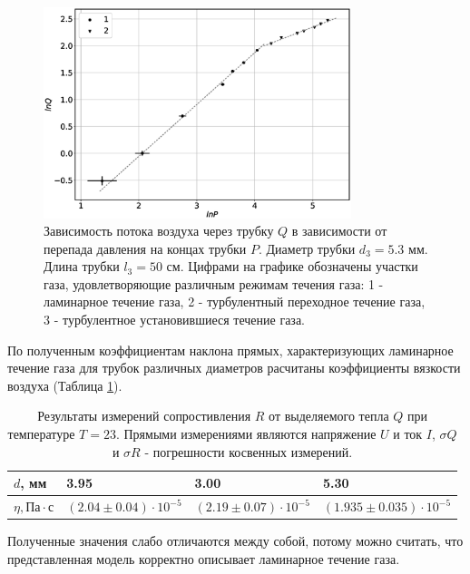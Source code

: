 \documentclass[12pt]{article}
\begin{document}
\begin{figure}[H]
    \centering
    \includegraphics[width=0.8\textwidth]{lnPlnQd3.eps}
    \caption{Зависимость потока воздуха через трубку $Q$ в зависимости от перепада давления на концах
        трубки $P$. Диаметр трубки $d_3 = 5.3$ мм. Длина трубки $l_3 = 50$ см. Цифрами на графике обозначены 
        участки газа, удовлетворяющие различным режимам течения газа: 
        1 - ламинарное течение газа,
        2 - турбулентный переходное течение газа, 
        3 - турбулентное установившиеся течение газа.}
    \label{fig:lnPlnQd3}
\end{figure}
По полученным коэффициентам наклона прямых, характеризующих ламинарное течение газа для трубок различных 
диаметров расчитаны коэффициенты вязкости воздуха (Таблица \ref{tab:nus}). 
\begin{table}[H]
    \centering
    \begin{tabular}{|l|l|l|l|}
        \hline
        $d$, мм                          & 3.95 & 3.00 & 5.30                             \\
        \hline
        $\eta, \text{Па} \cdot \text{с}$ & $    (2.04 \pm 0.04) \cdot 10 ^ {-5} $    & $ (2.19 \pm 0.07) \cdot 10 ^ {-5} $ & $ (1.935 \pm 0.035) \cdot 10 ^ {-5} $ \\
        \hline
    \end{tabular}
    
    \caption{Результаты измерений сопростивления \(R\) от выделяемого тепла \(Q\) при температуре \(T = 23\)\textcelsius.
        Прямыми измерениями являются напряжение \(U\) и ток \(I\), \(\sigma Q\) и \(\sigma R\) - погрешности косвенных измерений.}
    \label{tab:nus}
\end{table}
Полученные значения слабо отличаются между собой, потому можно считать, что представленная модель корректно описывает 
ламинарное течение газа. 
\end{document}
